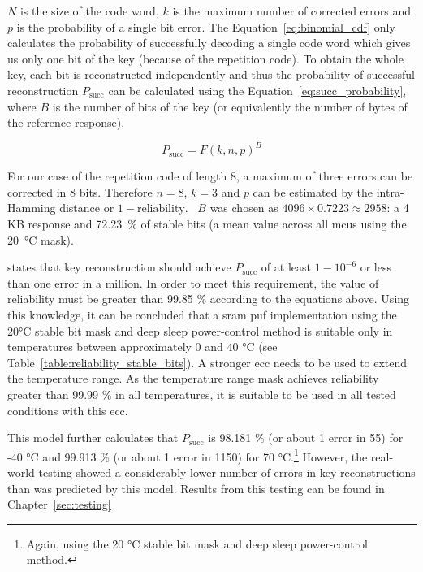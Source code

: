 $N$ is the size of the code word, $k$ is the maximum number of corrected errors and $p$ is the probability of a single bit error. The Equation~\ref{eq:binomial_cdf} only calculates the probability of successfully decoding a single code word which gives us only one bit of the key (because of the repetition code). To obtain the whole key, each bit is reconstructed independently and thus the probability of successful reconstruction $P_{\textrm{succ}}$ can be calculated using the Equation~\ref{eq:succ_probability}, where $B$ is the number of bits of the key (or equivalently the number of bytes of the reference response).

\begin{equation}\label{eq:succ_probability}
    P_{\textrm{succ}} = F(k, n, p)^{B} 
\end{equation}

For our case of the repetition code of length 8, a maximum of three errors can be corrected in 8 bits. Therefore $n = 8$, $k = 3$ and $p$ can be estimated by the intra-Hamming distance or $1 - \textrm{reliability}$.~\cite{Iluminada2015} $B$ was chosen as $4096 \times 0.7223 \approx 2958$: a 4 KB response and 72.23~\% of stable bits (a mean value across all \glspl{mcu} using the 20~°C mask).

\cite{Bosch2008} states that key reconstruction should achieve $P_{\textrm{succ}}$ of at least $1 - 10^{-6}$ or less than one error in a million. In order to meet this requirement, the value of reliability must be greater than 99.85 \% according to the equations above. Using this knowledge, it can be concluded that a \gls{sram} \gls{puf} implementation using the 20°C stable bit mask and deep sleep power-control method is suitable only in temperatures between approximately 0 and 40 °C (see Table~\ref{table:reliability_stable_bits}). A stronger \gls{ecc} needs to be used to extend the temperature range. As the temperature range mask achieves reliability greater than 99.99 \% in all temperatures, it is suitable to be used in all tested conditions with this \gls{ecc}.

This model further calculates that $P_{\textrm{succ}}$ is 98.181 \% (or about 1 error in 55) for -40 °C and 99.913 \% (or about 1 error in 1150) for 70 °C.\footnote{Again, using the 20 °C stable bit mask and deep sleep power-control method.} However, the real-world testing showed a considerably lower number of errors in key reconstructions than was predicted by this model. Results from this testing can be found in Chapter~\ref{sec:testing}

